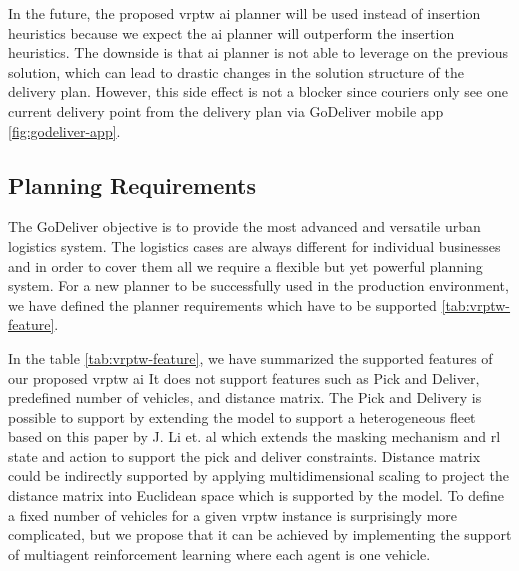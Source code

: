 In the future, the proposed \gls{vrptw} \gls{ai} planner will be used instead of insertion heuristics because we expect the \gls{ai} planner will outperform the insertion heuristics. The downside is that \gls{ai} planner is not able to leverage on the previous solution, which can lead to drastic changes in the solution structure of the delivery plan. However, this side effect is not a blocker since couriers only see one current delivery point from the delivery plan via GoDeliver mobile app \ref{fig:godeliver-app}.

\subsection{Planning Requirements}
The GoDeliver objective is to provide the most advanced and versatile urban logistics system. The logistics cases are always different for individual businesses and in order to cover them all we require a flexible but yet powerful planning system. For a new planner to be successfully used in the production environment, we have defined the planner requirements which have to be supported \ref{tab:vrptw-feature}. 

In the table \ref{tab:vrptw-feature}, we have summarized the supported features of our proposed \gls{vrptw} \gls{ai} It does not support features such as Pick and Deliver, predefined number of vehicles, and distance matrix. The Pick and Delivery is possible to support by extending the model to support a heterogeneous fleet based on this paper by J. Li et. al \cite{pick-deliver-ai} which extends the masking mechanism and \gls{rl} state and action to support the pick and deliver constraints. Distance matrix could be indirectly supported by applying multidimensional scaling \cite{multidimensional-scaling} to project the distance matrix into Euclidean space which is supported by the model. To define a fixed number of vehicles for a given \gls{vrptw} instance is surprisingly more complicated, but we propose that it can be achieved by implementing the support of multiagent reinforcement learning \cite{multiagent-rl} where each agent is one vehicle.

